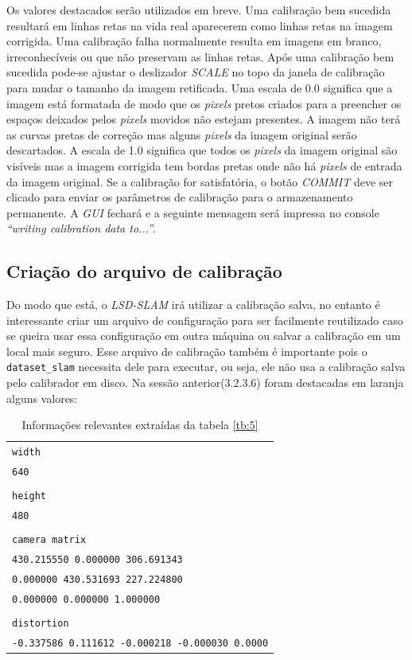 

 
Os valores destacados serão utilizados em breve. Uma calibração bem sucedida resultará em linhas retas na vida real aparecerem como linhas retas na imagem corrigida. Uma calibração falha normalmente resulta em imagens em branco, irreconhecíveis ou que não preservam as linhas retas.
Após uma calibração bem sucedida pode-se ajustar o deslizador \textit{SCALE} no topo da janela de calibração para mudar o tamanho da imagem retificada. Uma escala de 0.0 significa que a imagem está formatada de modo que os \textit{pixels} pretos criados para a preencher os espaços deixados pelos \textit{pixels} movidos não estejam presentes. A imagem não terá as curvas pretas de correção mas alguns \textit{pixels} da imagem original serão descartados. A escala de 1.0 significa que todos os \textit{pixels} da imagem original são visíveis mas a imagem corrigida tem bordas pretas onde não há \textit{pixels} de entrada da imagem original.
Se a calibração for satisfatória, o botão \textit{COMMIT} deve ser clicado para enviar os parâmetros de calibração para o armazenamento permanente. A \textit{GUI} fechará e a seguinte mensagem será impressa no console \textit{“writing calibration data to...”}.

\subsection{Criação do arquivo de calibração}

Do modo que está, o \textit{LSD-SLAM} irá utilizar a calibração salva, no entanto é interessante criar um arquivo de configuração para ser facilmente reutilizado caso se queira usar essa configuração em outra máquina ou salvar a calibração em um local mais seguro. Esse arquivo de calibração também é importante pois o \texttt{dataset\_slam} necessita dele para executar, ou seja, ele não usa a calibração salva pelo calibrador em disco. Na sessão anterior(3.2.3.6) foram destacadas em laranja alguns valores:

\begin{table}[!ht]\label{tb:6}
\begin{tabular}{| p{\textwidth}|}
\hline\texttt{width}\\
\texttt{640}\\
\\
\texttt{height}\\
\texttt{480}\\
\\
\texttt{camera matrix}\\
\texttt{430.215550 0.000000 306.691343}\\
\texttt{0.000000 430.531693 227.224800}\\
\texttt{0.000000 0.000000 1.000000}\\
\\
\texttt{distortion}\\
\texttt{-0.337586 0.111612 -0.000218 -0.000030 0.0000}\\
\hline
\end{tabular}
\caption{Informações relevantes extraídas da tabela \ref{tb:5}}
\end{table}


